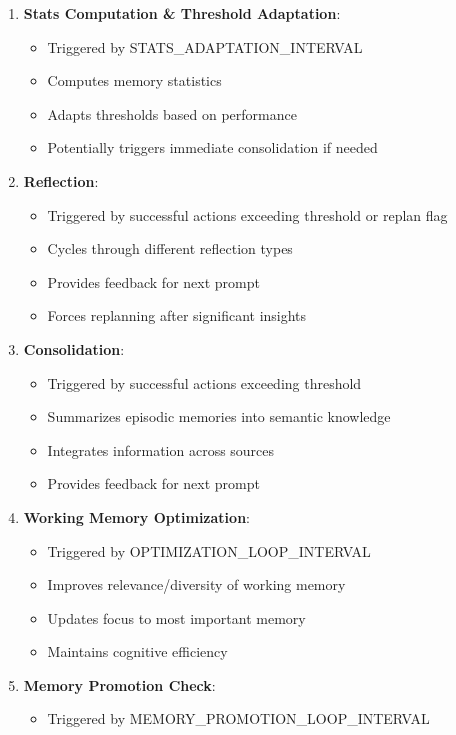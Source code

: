 \documentclass[12pt,a4paper]{article}
\begin{document}
\begin{enumerate}[label=\arabic*.]
    \item \textbf{Stats Computation \& Threshold Adaptation}:
    \begin{itemize}
        \item Triggered by STATS\_ADAPTATION\_INTERVAL
        \item Computes memory statistics
        \item Adapts thresholds based on performance
        \item Potentially triggers immediate consolidation if needed
    \end{itemize}
    \item \textbf{Reflection}:
    \begin{itemize}
        \item Triggered by successful actions exceeding threshold or replan flag
        \item Cycles through different reflection types
        \item Provides feedback for next prompt
        \item Forces replanning after significant insights
    \end{itemize}
    \item \textbf{Consolidation}:
    \begin{itemize}
        \item Triggered by successful actions exceeding threshold
        \item Summarizes episodic memories into semantic knowledge
        \item Integrates information across sources
        \item Provides feedback for next prompt
    \end{itemize}
    \item \textbf{Working Memory Optimization}:
    \begin{itemize}
        \item Triggered by OPTIMIZATION\_LOOP\_INTERVAL
        \item Improves relevance/diversity of working memory
        \item Updates focus to most important memory
        \item Maintains cognitive efficiency
    \end{itemize}
    \item \textbf{Memory Promotion Check}:
    \begin{itemize}
        \item Triggered by MEMORY\_PROMOTION\_LOOP\_INTERVAL

\end{itemize}
\end{enumerate}
\end{document}

